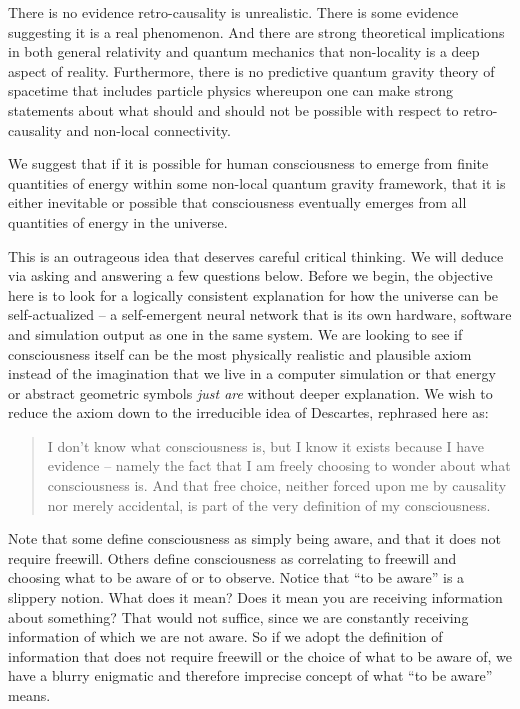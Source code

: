 \documentclass[submission,copyright,creativecommons]{eptcs}
\begin{document}
There is no evidence retro-causality is unrealistic. There is some evidence suggesting it is a real phenomenon. And there are strong theoretical implications in both general relativity and quantum mechanics that non-locality is a deep aspect of reality. Furthermore, there is no predictive quantum gravity theory of spacetime that includes particle physics whereupon one can make strong statements about what should and should not be possible with respect to retro-causality and non-local connectivity.



We suggest that if it is possible for human consciousness to emerge from finite quantities of energy within some non-local quantum gravity framework, that it is either inevitable or possible that consciousness eventually emerges from all quantities of energy in the universe.

This is an outrageous idea that deserves careful critical thinking. We will deduce via asking and answering a few questions below. Before we begin, the objective here is to look for a logically consistent explanation for how the universe can be self-actualized --
a self-emergent neural network that is its own hardware, software and simulation output as one in the same system. We are looking to see if consciousness itself can be the most physically realistic and plausible axiom instead of the imagination that we live in a computer simulation or that energy or abstract geometric symbols \textit{just are} without deeper explanation. We wish to reduce the axiom down to the irreducible idea of Descartes, rephrased here as:

\begin{quote}
I don’t know what consciousness is, but I know it exists because I have evidence --
namely the fact that I am freely choosing to wonder about what consciousness is. And that free choice, neither forced upon me by causality nor merely accidental, is part of the very definition of my consciousness.
  \source{  }
\end{quote}
Note that some define consciousness as simply being aware, and that it does not require freewill. Others define consciousness as correlating to freewill and choosing what to be aware of or to observe. Notice that “to be aware” is a slippery notion. What does it mean? Does it mean you are receiving information about something? That would not suffice, since we are constantly receiving information of which we are not aware. So if we adopt the definition of information that does not require freewill or the choice of what to be aware of, we have a blurry enigmatic and therefore imprecise concept of what “to be aware” means.
\end{document}
